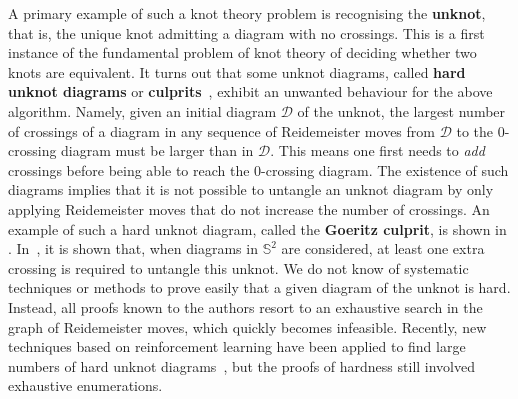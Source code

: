\documentclass[10pt,a4paper]{amsart}
\begin{document}
A primary example of such a knot theory problem is recognising the \textbf{unknot}, that is, the unique knot admitting a diagram with no crossings. This is a first instance of the fundamental problem of knot theory of deciding whether two knots are equivalent. It turns out that some unknot diagrams, called \textbf{hard unknot diagrams} or \textbf{culprits}~\cite{Mesmay_hard_unknot,Kauffman_untangling}, exhibit an unwanted behaviour for the above algorithm. Namely, given an initial diagram $\mathcal{D}$ of the unknot, the largest number of crossings of a diagram in any sequence of Reidemeister moves from $\mathcal{D}$ to the $0$-crossing diagram must be larger than in $\mathcal{D}$. This means one first needs to \emph{add} crossings before being able to reach the $0$-crossing diagram. The existence of such diagrams implies that it is not possible to untangle an unknot diagram by only applying Reidemeister moves that do not increase the number of crossings. An example of such a hard unknot diagram, called the \textbf{Goeritz culprit}, is shown in . In~\cite{Mesmay_hard_unknot}, it is shown that, when diagrams in $\mathbb{S}^2$ are considered, at least one extra crossing is required to untangle this unknot. We do not know of systematic techniques or methods to prove easily that a given diagram of the unknot is hard. Instead, all proofs known to the authors resort to an exhaustive search in the graph of Reidemeister moves, which quickly becomes infeasible. Recently, new techniques based on reinforcement learning have been applied to find large numbers of hard unknot diagrams~\cite{applebaum2024unknotting}, but the proofs of hardness still involved exhaustive enumerations.
\end{document}
